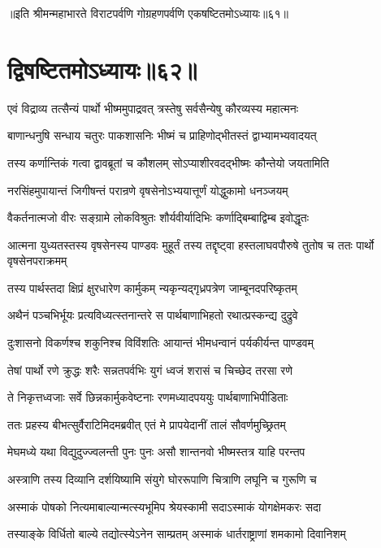 ॥इति श्रीमन्महाभारते विराटपर्वणि गोग्रहणपर्वणि एकषष्टितमोऽध्यायः॥६१॥

\chapter{द्विषष्टितमोऽध्यायः॥६२॥}

\twolineshloka
{एवं विद्राव्य तत्सैन्यं पार्थो भीष्ममुपाद्रवत्}
{त्रस्तेषु सर्वसैन्येषु कौरव्यस्य महात्मनः}


\twolineshloka
{बाणान्धनुषि सन्धाय चतुरः पाकशासनिः}
{भीष्मं च प्राहिणोद्भीतस्तं द्वाभ्यामभ्यवादयत्}


\twolineshloka
{तस्य कर्णान्तिकं गत्वा द्वावब्रूतां च कौशलम्}
{सोऽप्याशीरवदद्भीष्मः कौन्तेयो जयतामिति}


\twolineshloka
{नरसिंहमुपायान्तं जिगीषन्तं परान्रणे}
{वृषसेनोऽभ्ययात्तूर्णं योद्धुकामो धनञ्जयम्}


\twolineshloka
{वैकर्तनात्मजो वीरः सङ्ग्रामे लोकविश्रुतः}
{शौर्यवीर्यादिभिः कर्णाद्बिम्बाद्विम्ब इवोद्धृतः}


\threelineshloka
{आत्मना युध्यतस्तस्य वृषसेनस्य पाण्डवः}
{मुहूर्तं तस्य तद्दृष्ट्वा हस्तलाघवपौरुषे}
{तुतोष च ततः पार्थो वृषसेनपराक्रमम्}


\twolineshloka
{तस्य पार्थस्तदा क्षिप्रं क्षुरधारेण कार्मुकम्}
{न्यकृन्यद्गृध्रपत्रेण जाम्बूनदपरिष्कृतम्}


\twolineshloka
{अथैनं पञ्चभिर्भूयः प्रत्यविध्यत्स्तनान्तरे}
{स पार्थबाणाभिहतो रथात्प्रस्कन्द्य दुद्रुवे}


\twolineshloka
{दुःशासनो विकर्णश्च शकुनिश्च विविंशतिः}
{आयान्तं भीमधन्वानं पर्यकीर्यन्त पाण्डवम्}


\twolineshloka
{तेषां पार्थो रणे क्रुद्धः शरैः सन्नतपर्वभिः}
{युगं ध्वजं शरासं च चिच्छेद तरसा रणे}


\twolineshloka
{ते निकृत्तध्वजाः सर्वे छिन्नकार्मुकवेष्टनाः}
{रणमध्यादपययुः पार्थबाणाभिपीडिताः}


\twolineshloka
{ततः प्रहस्य बीभत्सुर्वैराटिमिदमब्रवीत्}
{एतं मे प्रापयेदानीं तालं सौवर्णमुच्छ्रितम्}


\twolineshloka
{मेघमध्ये यथा विद्युदुज्ज्वलन्ती पुनः पुनः}
{असौ शान्तनवो भीष्मस्तत्र याहि परन्तप}


\twolineshloka
{अस्त्राणि तस्य दिव्यानि दर्शयिष्यामि संयुगे}
{घोररूपाणि चित्राणि लघूनि च गुरूणि च}


\twolineshloka
{अस्माकं पोषको नित्यमाबाल्यान्मत्स्यभूमिप}
{श्रेयस्कामी सदाऽस्माकं योगक्षेमकरः सदा}


\twolineshloka
{तस्याङ्के विर्धितो बाल्ये तद्योत्स्येऽनेन साम्प्रतम्}
{अस्माकं धार्तराष्ट्राणां शमकामो दिवानिशम्}


